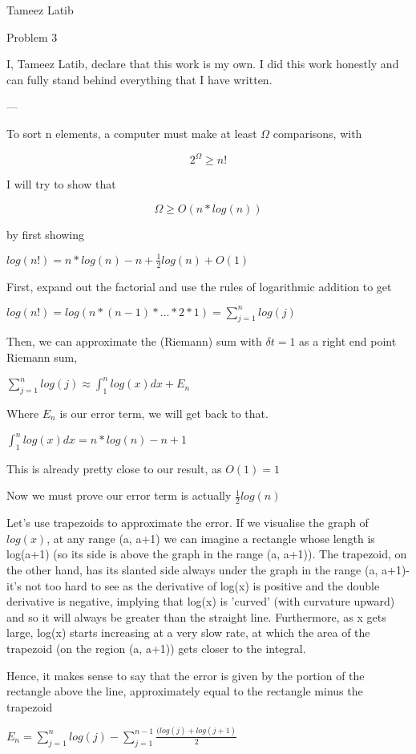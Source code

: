 \documentclass{article}
\begin{document}
Tameez Latib

Problem 3

I, Tameez Latib, declare that this work is my own. I did this work honestly and can fully stand behind everything that I have written.

---

To sort n elements, a computer must make at least $\Omega $ comparisons, with 

$$2^\Omega \ge n!$$

I will try to show that 

$$\Omega \ge O(n* log(n))$$

by first showing

$log(n!) = n*log(n) - n + \frac{1}{2} log(n) + O(1)  $

First, expand out the factorial and use the rules of logarithmic addition to get

$log(n!) = log(n*(n-1)*...*2*1) = \sum_{j=1}^n log(j)$

Then, we can approximate the (Riemann) sum with $\delta t = 1$ as a right end point Riemann sum,

$ \sum_{j=1}^n log(j) \approx \int_1^n log(x)dx + E_n$

Where $E_n$ is our error term, we will get back to that.

$\int_1^n log(x)dx = n*log(n) - n + 1$

This is already pretty close to our result, as $O(1) = 1$

Now we must prove our error term is actually $\frac{1}{2} log(n)$

Let's use trapezoids to approximate the error. If we visualise the graph of $log(x)$, at any range (a, a+1) we can imagine a rectangle whose length is log(a+1) (so its side is above the graph in the range (a, a+1)). The trapezoid, on the other hand, has its slanted side always under the graph in the range (a, a+1)- it's not too hard to see as the derivative of log(x) is positive and the double derivative is negative, implying that log(x) is 'curved' (with curvature upward) and so it will always be greater than the straight line. 
Furthermore, as x gets large, log(x) starts increasing at a very slow rate, at which the area of the trapezoid (on the region (a, a+1)) gets closer to the integral.

Hence, it makes sense to say that the error is given by the portion of the rectangle above the line, approximately equal to the rectangle minus the trapezoid 

$E_n =  \sum_{j=1}^n log(j) -  \sum_{j=1}^{n-1} \frac{(log(j)+log(j+1)}{2}$
\end{document}
